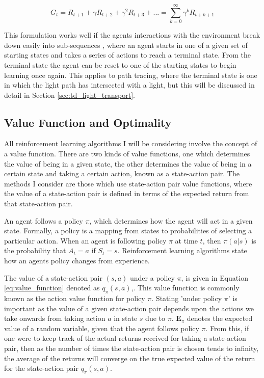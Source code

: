\documentclass[../dissertation.tex]{subfiles}
\begin{document}
\begin{equation}
\label{eq:return}
G_t = R_{t+1} + \gamma R_{t+2} + \gamma^2 R_{t+3} + ... = \sum^\infty_{k=0} \gamma^k R_{t+k+1}
\end{equation}

This formulation works well if the agents interactions with the environment break down easily into sub-sequences \cite{sutton2011reinforcement}, where an agent starts in one of a given set of starting states and takes a series of actions to reach a terminal state. From the terminal state the agent can be reset to one of the starting states to begin learning once again. This applies to path tracing, where the terminal state is one in which the light path has intersected with a light, but this will be discussed in detail in Section \ref{sec:td_light_transport}.

\subsection{Value Function and Optimality}
\label{sec:optimal_value}
All reinforcement learning algorithms I will be considering involve the concept of a value function. There are two kinds of value functions, one which determines the value of being in a given state, the other determines the value of being in a certain state and taking a certain action, known as a state-action pair. The methods I consider are those which use state-action pair value functions, where the value of a state-action pair is defined in terms of the expected return from that state-action pair.

An agent follows a policy $\pi$, which determines how the agent will act in a given state. Formally, a policy is a mapping from states to probabilities of selecting a particular action. When an agent is following policy $\pi$ at time $t$, then $\pi(a|s)$ is the probability that $A_t = a$ if $S_t = s$. Reinforcement learning algorithms state how an agents policy changes from experience. 

The value of a state-action pair $(s,a)$ under a policy $\pi$, is given in Equation \ref{eq:value_function} denoted as $q_\pi(s,a)$,. This value function is commonly known as the action value function for policy $\pi$. Stating 'under policy $\pi$' is important as the value of a given state-action pair depends upon the actions we take onwards from taking action $a$ in state $s$ due to $\pi$. $\mathbf{E}_\pi$ denotes the expected value of a random variable, given that the agent follows policy $\pi$. From this, if one were to keep track of the actual returns received for taking a state-action pair, then as the number of times the state-action pair is chosen tends to infinity, the average of the returns will converge on the true expected value of the return for the state-action pair $q_\pi(s,a)$.
\end{document}
